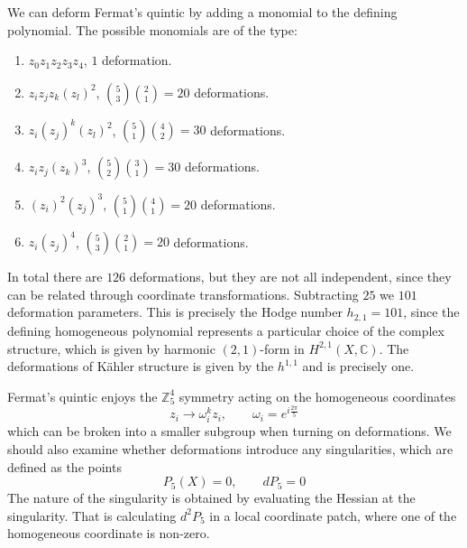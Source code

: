 We can deform Fermat's quintic by adding a monomial to the defining polynomial.
The possible monomials are of the type:
\begin{enumerate}
  \item $z_0z_1z_2z_3z_4$, $1$ deformation.
  \item $z_i z_j z_k(z_l)^2$, ${5}\choose{3}$${2}\choose{1}$$=20$ deformations. 
  \item $z_i(z_j)^k(z_l)^2$, ${5}\choose{1}$${4}\choose{2}$$=30$ deformations.
  \item $z_i z_j(z_k)^3$, ${5}\choose{2}$${3}\choose{1}$$=30$ deformations.
  \item $(z_i)^2(z_j)^3$, ${5}\choose{1}$${4}\choose{1}$$=20$ deformations.
  \item $z_i(z_j)^4$, ${5}\choose{3}$${2}\choose{1}$$=20$ deformations.
\end{enumerate}
In total there are $126$ deformations, but they are not all independent, since they 
can be related through coordinate transformations.
Subtracting  $25$ we $101$ deformation parameters.
This is precisely the Hodge number $h_{2,1}=101$, since the defining homogeneous polynomial  
represents a particular choice of the complex structure, which is given by 
harmonic $(2,1)$-form in $H^{2,1}(X,\mathbb C)$.
The deformations of Kähler structure is given by the $h^{1,1}$ and is precisely one.

Fermat's quintic enjoys the $\mathbb Z_5^4$ symmetry acting on the homogeneous coordinates 
\begin{equation}
  z_i \to \omega^k_i z_i, \qquad \omega_i=e^{i\frac{2\pi}{5}}
\end{equation}
which can be broken into a smaller subgroup when turning on deformations.
We should also examine whether deformations introduce any singularities, which
are defined as the points 
\begin{equation}
  P_5(X)=0, \qquad dP_5=0
\end{equation}
The nature of the singularity is obtained by evaluating the Hessian at the singularity.
That is calculating $d^2 P_5$ in a local coordinate patch, where one of the homogeneous coordinate is non-zero.


